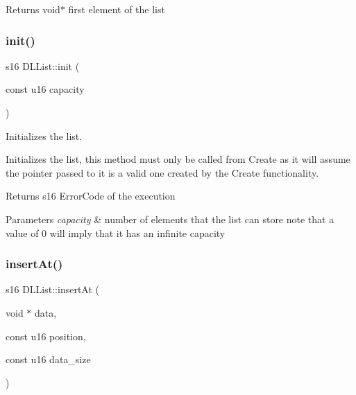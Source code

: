 \begin{DoxyReturn}{Returns}
void$\ast$ first element of the list 
\end{DoxyReturn}
\mbox{\label{class_d_l_list_aedbf4ff6aebd168e39d4c1534462c864}} 
\subsubsection{\texorpdfstring{init()}{init()}}
{\footnotesize\ttfamily s16 D\+L\+List\+::init (\begin{DoxyParamCaption}\item[{const u16}]{capacity }\end{DoxyParamCaption})}



Initializes the list. 

Initializes the list, this method must only be called from Create as it will assume the pointer passed to it is a valid one created by the Create functionality.

\begin{DoxyReturn}{Returns}
s16 Error\+Code of the execution 
\end{DoxyReturn}

\begin{DoxyParams}{Parameters}
{\em capacity} & number of elements that the list can store note that a value of 0 will imply that it has an infinite capacity \\
\hline
\end{DoxyParams}
\mbox{\label{class_d_l_list_a7e19cb0bd835bf2d5f8be47119d755b6}} 
\subsubsection{\texorpdfstring{insert\+At()}{insertAt()}}
{\footnotesize\ttfamily s16 D\+L\+List\+::insert\+At (\begin{DoxyParamCaption}\item[{void $\ast$}]{data,  }\item[{const u16}]{position,  }\item[{const u16}]{data\+\_\+size }\end{DoxyParamCaption})}



